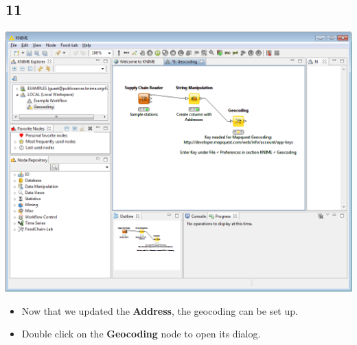 \documentclass{beamer}
\begin{document}
\subsection{11}
\begin{frame}
	\begin{center}
  		\includegraphics[height=0.6\textheight]{11.png}
	\end{center}
	\begin{itemize}
		\item Now that we updated the \textbf{Address}, the geocoding can be set up.
		\item Double click on the \textbf{Geocoding} node to open its dialog.
	\end{itemize}
\end{frame}
\end{document}
